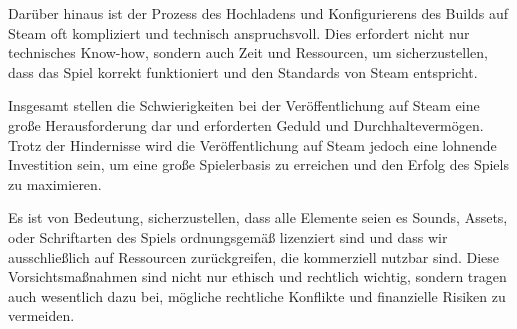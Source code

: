 Darüber hinaus ist der Prozess des Hochladens und Konfigurierens des Builds auf Steam oft kompliziert und technisch anspruchsvoll. Dies erfordert nicht nur technisches Know-how, sondern auch Zeit und Ressourcen, um sicherzustellen, dass das Spiel korrekt funktioniert und den Standards von Steam entspricht.

Insgesamt stellen die Schwierigkeiten bei der Veröffentlichung auf Steam eine große Herausforderung dar und erforderten Geduld und Durchhaltevermögen.
Trotz der Hindernisse wird die Veröffentlichung auf Steam jedoch eine lohnende Investition sein, um eine große Spielerbasis zu erreichen und den Erfolg des Spiels zu maximieren.



Es ist von Bedeutung, sicherzustellen, dass alle Elemente seien es Sounds, Assets, oder Schriftarten des Spiels ordnungsgemäß lizenziert sind und dass wir ausschließlich auf Ressourcen zurückgreifen, die kommerziell nutzbar sind.
Diese Vorsichtsmaßnahmen sind nicht nur ethisch und rechtlich wichtig, sondern tragen auch wesentlich dazu bei, mögliche rechtliche Konflikte und finanzielle Risiken zu vermeiden.

%

\renewcommand{\kapitelautor}{}